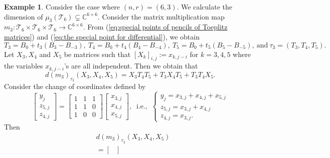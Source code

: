 \documentclass[reqno]{amsart}
\theoremstyle{definition}
\newtheorem{example}[theorem]{Example}
\numberwithin{equation}{section}
\begin{document}
\begin{example}
    Consider the case where $(n,r)=(6,3)$. We calculate the dimension of $\mu_3(\mathcal{T}_6) \subsetneq \mathbb{C}^{6 \times 6}$. Consider the matrix multiplication map $m_3:\mathcal{T}_6 \times \mathcal{T}_6 \times \mathcal{T}_6 \rightarrow \mathbb{C}^{6 \times 6}$. From (\ref{eq:special points of pencils of Toeplitz matrices}) and (\ref{eq:the special point for differential}), we obtain
    \begin{equation*}
        T_3=B_0+t_3(B_3-B_{-3}),~T_4=B_0+t_4(B_4-B_{-4}),~T_5=B_0+t_5(B_5-B_{-5}),~\text{and}~\tau_3=(T_3,T_4,T_5).
    \end{equation*}
    Let $X_3,X_4$ and $X_5$ be matrices such that $[X_{k}]_{i,j}:=x_{k,j-i}$ for $k=3,4,5$ where the variables $x_{k,j-i}$'s are all independent. Then we obtain that
    \begin{equation*}
        d(m_3)_{\tau_3}(X_3,X_4,X_5)=X_3T_4T_5+T_3X_4T_5+T_3T_4X_5.
    \end{equation*}
    Consider the change of coordinates defined by 
    \begin{equation}\label{eq:change of coordinates 2}
        \begin{bmatrix}
            y_j\\
            z_{5,j}\\
            z_{4,j}
        \end{bmatrix}=\begin{bmatrix}
            1 & 1 & 1\\
            1 & 1 & 0\\
            1 & 0 & 0
        \end{bmatrix}\begin{bmatrix}
            x_{3,j}\\ x_{4,j} \\ x_{5,j}
        \end{bmatrix},~\text{ i.e., }~\begin{cases}
            y_j=x_{3,j}+x_{4,j}+x_{5,j}\\
            z_{5,j}=x_{3,j}+x_{4,j}\\
            z_{4,j}=x_{3,j}.
        \end{cases}
    \end{equation}
    Then 
    \begin{equation*}
        \begin{aligned}
            &d(m_3)_{\tau_3}(X_3,X_4,X_5)\\
            &=\begin{bmatrix}

\end{bmatrix}
\end{aligned}
\end{equation*}
\end{example}
\end{document}
